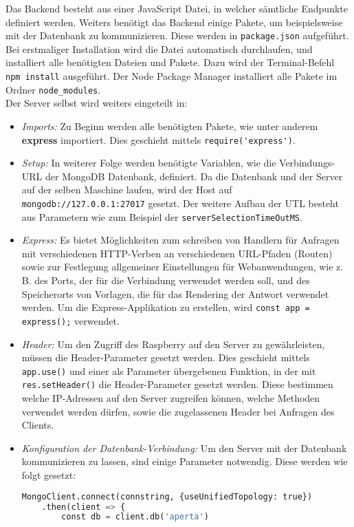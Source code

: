 Das Backend besteht aus einer JavaScript Datei, in welcher sämtliche Endpunkte definiert werden. Weiters benötigt das Backend einige Pakete, um beispielsweise mit der Datenbank zu kommunizieren. Diese werden in \verb|package.json| aufgeführt. Bei erstmaliger Installation wird die Datei automatisch durchlaufen, und installiert alle benötigten Dateien und Pakete. Dazu wird der Terminal-Befehl \verb|npm install| ausgeführt. Der Node Package Manager installiert alle Pakete im Ordner \verb|node_modules|.\\
Der Server selbst wird weiters eingeteilt in:

\begin{itemize}
    \item \textit{Imports: } Zu Beginn werden alle benötigten Pakete, wie unter anderem \textbf{express} importiert. Dies geschieht mittels \verb|require('express')|.
    \item \textit{Setup:  } In weiterer Folge werden benötigte Variablen, wie die Verbindungs-URL der MongoDB Datenbank, definiert. Da die Datenbank und der Server auf der selben Maschine laufen, wird der Host auf \verb|mongodb://127.0.0.1:27017| gesetzt. Der weitere Aufbau der UTL besteht aus Parametern wie zum Beispiel der \verb|serverSelectionTimeOutMS|.
    \item \textit{Express: }  Es bietet Möglichkeiten zum schreiben von Handlern für Anfragen mit verschiedenen HTTP-Verben an verschiedenen URL-Pfaden (Routen) sowie zur Festlegung allgemeiner Einstellungen für Webanwendungen, wie z. B. des Ports, der für die Verbindung verwendet werden soll, und des Speicherorts von Vorlagen, die für das Rendering der Antwort verwendet werden. Um die Express-Applikation zu erstellen, wird \verb|const app = express();| verwendet.
    \item \textit{Header: } Um den Zugriff des Raspberry auf den Server zu gewährleisten, müssen die Header-Parameter gesetzt werden. Dies geschieht mittels \verb|app.use()| und einer als Parameter übergebenen Funktion, in der mit \verb|res.setHeader()| die Header-Parameter gesetzt werden. Diese bestimmen welche IP-Adressen auf den Server zugreifen können, welche Methoden verwendet werden dürfen, sowie die zugelassenen Header bei Anfragen des Clients.
    \item \textit{Konfiguration der Datenbank-Verbindung: } Um den Server mit der Datenbank kommunizieren zu lassen, sind einige Parameter notwendig. Diese werden wie folgt gesetzt: 
    \begin{lstlisting}[language=Python, caption=Konfiguration der Datenbankanbindung, label=lst:impl:dbconf]
    MongoClient.connect(connstring, {useUnifiedTopology: true})
    .then(client => {
        const db = client.db('aperta')


\end{lstlisting}
\end{itemize}

